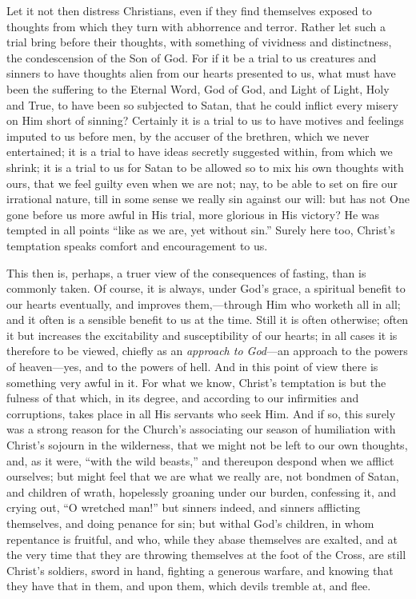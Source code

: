 Let it not then distress Christians, even if they find themselves
exposed to thoughts from which they turn with abhorrence and terror.
Rather let such a trial bring before their thoughts, with something of
vividness and distinctness, the condescension of the Son of God. For
if it be a trial to us creatures and sinners to have thoughts alien
from our hearts presented to us, what must have been the suffering to
the Eternal Word, God of God, and Light of Light, Holy and True, to
have been so subjected to Satan, that he could inflict every misery on
Him short of sinning? Certainly it is a trial to us to have motives
and feelings imputed to us before men, by the accuser of the brethren,
which we never entertained; it is a trial to have ideas secretly
suggested within, from which we shrink; it is a trial to us for Satan
to be allowed so to mix his own thoughts with ours, that we feel
guilty even when we are not; nay, to be able to set on fire our
irrational nature, till in some sense we really sin against our will:
but has not One gone before us more awful in His trial, more glorious
in His victory? He was tempted in all points ``like as we are, yet
without sin.'' Surely here too, Christ's temptation speaks comfort
and encouragement to us.

This then is, perhaps, a truer view of the consequences of fasting,
than is commonly taken. Of course, it is always, under God's grace, a
spiritual benefit to our hearts eventually, and improves them,—through
Him who worketh all in all; and it often is a sensible benefit to us
at the time. Still it is often otherwise; often it but increases the
excitability and susceptibility of our hearts; in all cases it is
therefore to be viewed, chiefly as an \emph{approach to God}—an
approach to the powers of heaven—yes, and to the powers of hell. And
in this point of view there is something very awful in it. For what we
know, Christ's temptation is but the fulness of that which, in its
degree, and according to our infirmities and corruptions, takes place
in all His servants who seek Him. And if so, this surely was a strong
reason for the Church's associating our season of humiliation with
Christ's sojourn in the wilderness, that we might not be left to our
own thoughts, and, as it were, ``with the wild beasts,'' and
thereupon despond when we afflict ourselves; but might feel that we
are what we really are, not bondmen of Satan, and children of wrath,
hopelessly groaning under our burden, confessing it, and crying out,
``O wretched man!'' but sinners indeed, and sinners afflicting
themselves, and doing penance for sin; but withal God's children, in
whom repentance is fruitful, and who, while they abase themselves are
exalted, and at the very time that they are throwing themselves at the
foot of the Cross, are still Christ's soldiers, sword in hand,
fighting a generous warfare, and knowing that they have that in them,
and upon them, which devils tremble at, and flee.

